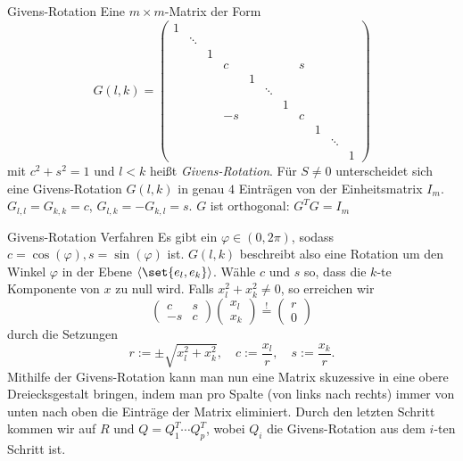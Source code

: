 \begin{karte}{Givens-Rotation}
    Eine \(m \times m\)-Matrix der Form 
    \[ G(l,k) = \left( \begin{array}{ccccccccccc}
        1 &&&&&&&&&& \\
        &\ddots&&&&&&&&& \\
        && 1 &&&&&&&& \\
        &&& c &&&& s &&& \\
        &&&& 1 &&&&&& \\
        &&&&& \ddots &&&&& \\
        &&&&&& 1 &&&& \\
        &&& -s &&&& c &&& \\
        &&&&&&&& 1 &&\\
        &&&&&&&&& \ddots & \\
        &&&&&&&&&& 1
    \end{array} \right) \]
    mit \( c^2 + s^2 = 1 \) und \( l < k\) heißt \textit{Givens-Rotation}. Für \( S \neq 0 \) 
    unterscheidet sich eine Givens-Rotation \( G(l,k) \) in genau \( 4 \) Einträgen von der 
    Einheitsmatrix \(I_m\). \( G_{l,l} = G_{k,k} = c \), \( G_{l,k} = -G_{k,l} = s \).
    \( G \) ist orthogonal: \( G^T G = I_m \)
\end{karte}

\begin{karte}{Givens-Rotation Verfahren}
    Es gibt ein \( \varphi \in (0,2\pi) \), sodass \( c = \cos(\varphi), s = \sin(\varphi) \) ist. 
    \( G(l,k) \) beschreibt also eine Rotation um den Winkel \( \varphi \) in der Ebene 
    \( \langle \set{e_l, e_k } \rangle \).
    Wähle \( c \) und \(s\) so, dass die \(k\)-te Komponente von \(x\) zu null wird. Falls \( x_l^2 + x_k^2 \neq 0 \), 
    so erreichen wir 
    \[ \begin{pmatrix}
        c & s \\ -s & c
    \end{pmatrix} \begin{pmatrix}
        x_l \\ x_k
    \end{pmatrix} \overset{!}{=} \begin{pmatrix}
        r \\ 0
    \end{pmatrix} \]
    durch die Setzungen 
    \[ r := \pm \sqrt{x_l^2 + x_k^2}, \quad c := \frac{x_l}{r}, \quad s := \frac{x_k}{r}. \]
    Mithilfe der Givens-Rotation kann man nun eine Matrix skuzessive in eine obere 
    Dreiecksgestalt bringen, indem man pro Spalte (von links nach rechts) immer 
    von unten nach oben die Einträge der Matrix eliminiert.
    Durch den letzten Schritt kommen wir auf \(R\) und \( Q = Q_1^T \cdots Q_p^T \), 
    wobei \(Q_i\) die Givens-Rotation aus dem \(i\)-ten Schritt ist.
\end{karte}

